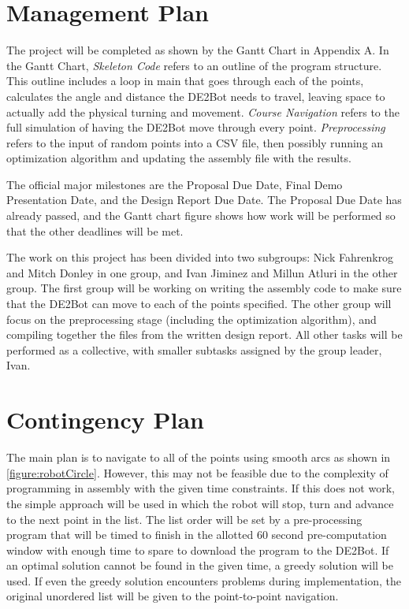 \documentclass[11pt,conference,onecolumn]{article} %
\begin{document}
\section*{Management Plan}
The project will be completed as shown by the Gantt Chart in Appendix A.
In the Gantt Chart, \emph{Skeleton Code} refers to an outline of the program structure. This outline includes a loop in main that goes through each of the points, calculates the angle and distance the DE2Bot needs to travel, leaving space to actually add the physical turning and movement. \emph{Course Navigation} refers to the full simulation of having the DE2Bot move through every point. \emph{Preprocessing} refers to the input of random points into a CSV file, then possibly running an optimization algorithm and updating the assembly file with the results.\par
The official major milestones are the Proposal Due Date, Final Demo Presentation Date, and the Design Report Due Date. The Proposal Due Date has already passed, and the Gantt chart figure shows how work will be performed so that the other deadlines will be met.\par
The work on this project has been divided into two subgroups: Nick Fahrenkrog and Mitch Donley in one group, and Ivan Jiminez and Millun Atluri in the other group. The first group will be working on writing the assembly code to make sure that the DE2Bot can move to each of the points specified. The other group will focus on the preprocessing stage (including the optimization algorithm), and compiling together the files from the written design report. All other tasks will be performed as a collective, with smaller subtasks assigned by the group leader, Ivan. \par

\section*{Contingency Plan}
The main plan is to navigate to all of the points using smooth arcs as shown in \cref{figure:robotCircle}. However, this may not be feasible due to the complexity of programming in assembly with the given time constraints. If this does not work, the simple approach will be used in which the robot will stop, turn and advance to the next point in the list. The list order will be set by a pre-processing program that will be timed to finish in the allotted 60 second pre-computation window with enough time to spare to download the program to the DE2Bot. If an optimal solution cannot be found in the given time, a greedy solution will be used. If even the greedy solution encounters problems during implementation, the original unordered list will be given to the point-to-point navigation.
\end{document}
